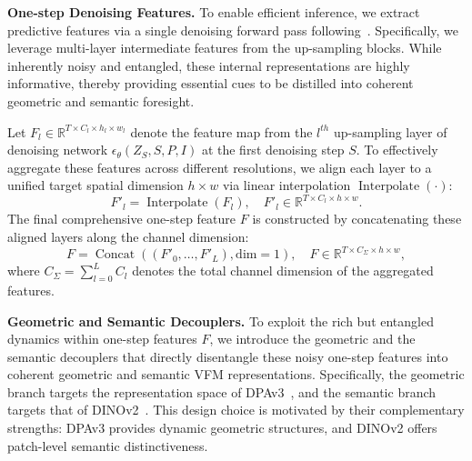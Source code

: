 
\label{sec:distill}
\noindent \textbf{One-step Denoising Features.}
To enable efficient inference, we extract predictive features via a single denoising forward pass following~\cite{huvideo}. Specifically, we leverage multi-layer intermediate features from the up-sampling blocks. While inherently noisy and entangled, these internal representations are highly informative, thereby providing essential cues to be distilled into coherent geometric and semantic foresight.

Let $F_l \in \mathbb{R}^{T \times C_l \times h_l \times w_l}$ denote the feature map from the $l^{th}$ up-sampling layer of denoising network $\epsilon_\theta(Z_{S},S,P,I)$ at the first denoising step $S$. To effectively aggregate these features across different resolutions, we align each layer to a unified target spatial dimension $h \times w$ via linear interpolation $\operatorname{Interpolate}(\cdot)$:
\begin{equation}
    F'_l = \operatorname{Interpolate}(F_l), \quad F'_l \in \mathbb{R}^{T \times C_l \times h \times w}.
\end{equation}
The final comprehensive one-step feature $F$ is constructed by concatenating these aligned layers along the channel dimension:
\begin{equation}
    F = \operatorname{Concat}((F'_0, \dots, F'_L), \text{dim}=1), \quad F \in \mathbb{R}^{T \times C_{\Sigma} \times h \times w},
\end{equation}
where $C_{\Sigma} = \sum_{l=0}^{L} C_{l}$ denotes the total channel dimension of the aggregated features.

\noindent \textbf{Geometric and Semantic Decouplers.}
To exploit the rich but entangled dynamics within one-step features $F$, we introduce the geometric and the semantic decouplers that directly disentangle these noisy one-step features into coherent geometric and semantic VFM representations. Specifically, the geometric branch targets the representation space of DPAv3~\cite{lin2025depth}, and the semantic branch targets that of DINOv2~\cite{oquab2023dinov2}. This design choice is motivated by their complementary strengths: DPAv3 provides dynamic geometric structures, and DINOv2 offers patch-level semantic distinctiveness.

